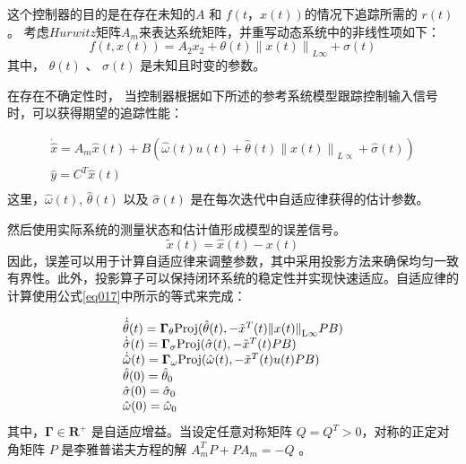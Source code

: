 这个控制器的目的是在存在未知的$A$ 和 $f(t，x(t))$的情况下追踪所需的 $r(t)$。 考虑$Hurwitz$矩阵$A_{m}$来表达系统矩阵，并重写动态系统中的非线性项如下：
\begin{equation}
f(t,x(t)) = {A_2}{x_2} + \theta (t){\left\| {x(t)} \right\|_{L\infty }} + \sigma (t)
\end{equation}
其中， $\theta(t)$ 、 $\sigma(t)$ 是未知且时变的参数。

在存在不确定性时， 当控制器根据如下所述的参考系统模型跟踪控制输入信号时，可以获得期望的追踪性能：

\begin{equation}
\begin{array}{l}
 \dot{\hat{x}} = {A_m}\hat x(t) + {B}(\hat \omega (t)u(t) + \hat \theta (t){\left\| {x(t)} \right\|_{L \propto }} + \hat \sigma (t)) \\
 \hat y = {C^T}\hat x(t) \\
 \end{array}
 \end{equation}
这里，$\hat \omega (t)$, $\hat \theta (t)$ 以及 $\hat \sigma (t)$ 是在每次迭代中自适应律获得的估计参数。

然后使用实际系统的测量状态和估计值形成模型的误差信号。
\begin{equation}
\tilde x(t) = \hat x(t) - x(t)
\end{equation}
因此，误差可以用于计算自适应律来调整参数，其中采用投影方法来确保均匀一致有界性。此外，投影算子可以保持闭环系统的稳定性并实现快速适应。自适应律的计算使用公式\ref{eq017}中所示的等式来完成：

\begin{equation}
\begin{array}{l}
 \dot {\hat {\theta }}(t) = {{\boldsymbol{\Gamma }}_\theta } {\rm{Proj}}(\hat \theta (t), - {{\tilde x}^T}(t){\left\| {x(t)} \right\|_{{\rm{L}}\infty }}PB) \\
 \dot {\hat {\sigma }}(t) = {{\boldsymbol{\Gamma }}_\sigma } {\rm{Proj}}(\hat \sigma (t), - {{\tilde x}^T}(t)PB) \\
 \dot {\hat {\omega }}(t) = {{\boldsymbol{\Gamma }}_\omega } {\rm{Proj}}(\hat \omega (t), - {{\tilde x}^T}(t)u(t)PB) \\
 \hat {\theta } (0)= {{\hat \theta }_0} \\
 \hat {\sigma } (0)= {{\hat \sigma }_0} \\
 \hat {\omega } (0)= {{\hat \omega }_0} \\
 \end{array}
 \end{equation}
其中，$\boldsymbol{\Gamma} \in {\mathbf{R}}^{ + }$ 是自适应增益。当设定任意对称矩阵 $Q=Q^{T}>0$，对称的正定对角矩阵 $P$ 是李雅普诺夫方程的解 $A_m^TP + P{A_m} =  - Q$ 。

